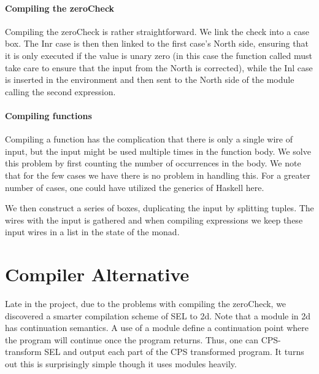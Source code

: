 \paragraph{Compiling the zeroCheck}
\label{sec:compiling-zerochk}

Compiling the zeroCheck is rather straightforward. We link the check into a case box. The Inr case is then then linked to the first case's North side, ensuring that it is only executed if the value is unary zero (in this case the function called must take care to ensure that the input from the North is corrected), while the Inl case is inserted in the environment and then sent to the North side of the module calling the second expression.


\paragraph{Compiling functions}
\label{sec:compiling-functions}

Compiling a function has the complication that there is only a single
wire of input, but the input might be used multiple times in the
function body. We solve this problem by first counting the number of
occurrences in the body. We note that for the few cases we have there
is no problem in handling this. For a greater number of cases, one could
have utilized the generics of Haskell here.

We then construct a series of boxes, duplicating the input by
splitting tuples. The wires with the input is gathered and when
compiling expressions we keep these input wires in a list in the state
of the monad.


\section{Compiler Alternative}
\label{chap:compiler-alter}

Late in the project, due to the problems with compiling the zeroCheck,
we discovered a smarter compilation scheme of SEL to 2d. Note that
a module in 2d has continuation semantics. A use of a module define a
continuation point where the program will continue once the program
returns. Thus, one can CPS-transform SEL and output each part of the
CPS transformed program. It turns out this is surprisingly simple
though it uses modules heavily.


